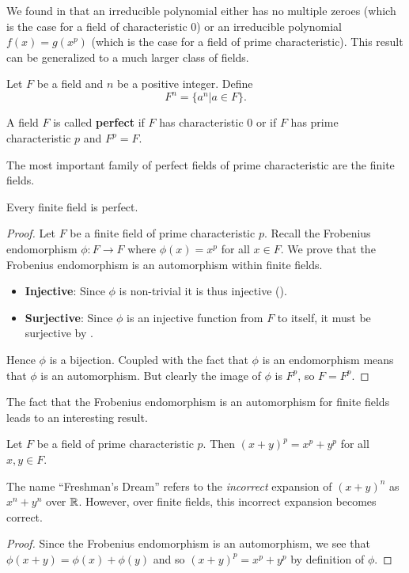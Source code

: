 We found in  that an irreducible polynomial either has no multiple zeroes (which is the case for a field of characteristic 0) or an irreducible polynomial $f(x) = g(x^p)$ (which is the case for a field of prime characteristic). This result can be generalized to a much larger class of fields.

\begin{definition}
    Let $F$ be a field and $n$ be a positive integer. Define
    \[
        F^n = \{a^n \vert a \in F\}.
    \]
\end{definition}

\begin{definition}
    A field $F$ is called \textbf{perfect} if $F$ has characteristic 0 or if $F$ has prime characteristic $p$ and $F^p = F$.
\end{definition}

The most important family of perfect fields of prime characteristic are the finite fields.

\begin{theorem}
    Every finite field is perfect.
\end{theorem}
\begin{proof}
    Let $F$ be a finite field of prime characteristic $p$. Recall the Frobenius endomorphism $\phi: F \to F$ where $\phi(x) = x^p$ for all $x \in F$. We prove that the Frobenius endomorphism is an automorphism within finite fields.
    \begin{itemize}
        \item \textbf{Injective}: Since $\phi$ is non-trivial it is thus injective ().
        \item \textbf{Surjective}: Since $\phi$ is an injective function from $F$ to itself, it must be surjective by .
    \end{itemize}
    Hence $\phi$ is a bijection. Coupled with the fact that $\phi$ is an endomorphism means that $\phi$ is an automorphism. But clearly the image of $\phi$ is $F^p$, so $F = F^p$.
\end{proof}

The fact that the Frobenius endomorphism is an automorphism for finite fields leads to an interesting result.

\begin{proposition}\label{prop-freshman-dream}
    Let $F$ be a field of prime characteristic $p$. Then $(x + y)^p = x^p + y^p$ for all $x,y \in F$.
\end{proposition}
\begin{remark}
    The name ``Freshman's Dream'' refers to the \textit{incorrect} expansion of $(x+y)^n$ as $x^n + y^n$ over $\mathbb{R}$. However, over finite fields, this incorrect expansion becomes correct.
\end{remark}
\begin{proof}
    Since the Frobenius endomorphism is an automorphism, we see that $\phi(x+y) = \phi(x) + \phi(y)$ and so $(x+y)^p = x^p + y^p$ by definition of $\phi$.
\end{proof}

